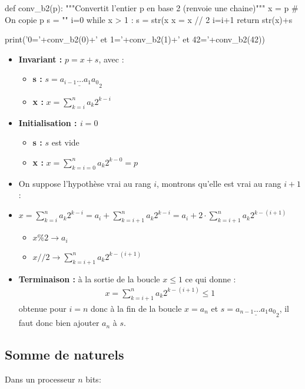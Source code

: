 \begin{pyconsole}
def conv_b2(p):
    """Convertit l'entier p en base 2 (renvoie une chaine)"""
    x = p # On copie p
    s = ""
    i=0
    while x > 1 : 
        s = str(x%
        x = x // 2
        i=i+1
    return str(x)+s

print('0='+conv_b2(0)+' et 1='+conv_b2(1)+' et 42='+conv_b2(42))
\end{pyconsole}
\begin{itemize}
\item \textbf{Invariant : } $p=x+s$, avec : 
\begin{itemize}
\item \textbf{s : } $s=\underline{a_{i-1}\dots a_1a_0}_2$
\item \textbf{x : } $x=\displaystyle{\sum_{k=i}^n a_k2^{k-i}}$
\end{itemize}
\item \textbf{Initialisation : $i=0$}
\begin{itemize}
\item \textbf{s : } $s$ est vide
\item \textbf{x : } $x=\displaystyle{\sum_{k=i=0}^n a_k2^{k-0}=p}$
\end{itemize}
\item On suppose l'hypothèse vrai au rang $i$, montrons qu'elle est vrai au rang $i+1$ : 
\item $x=\displaystyle{\sum_{k=i}^n a_k2^{k-i}=a_i+\sum_{k=i+1}^n a_k2^{k-i}=a_i+2\cdot \sum_{k=i+1}^n a_k2^{k-(i+1)}}$
\begin{itemize}
\item $x\%2\rightarrow a_i$
\item $x//2\rightarrow \displaystyle{\sum_{k=i+1}^n a_k2^{k-(i+1)}}$
\end{itemize}
\item \textbf{Terminaison : }
à la sortie de la boucle $x\leq 1$ ce qui donne :
\begin{align*}
x=\displaystyle{\sum_{k=i+1}^n a_k2^{k-(i+1)}}\leq 1
\end{align*}
obtenue pour $i=n$ donc à la fin de la boucle $x=a_n$ et $s=\underline{a_{n-1}\dots a_1a_0}_2$, il faut donc bien ajouter $a_n$ à $s$.
\end{itemize}

\subsection{Somme de naturels}
\sloppy

Dans un processeur $n$ bits:

